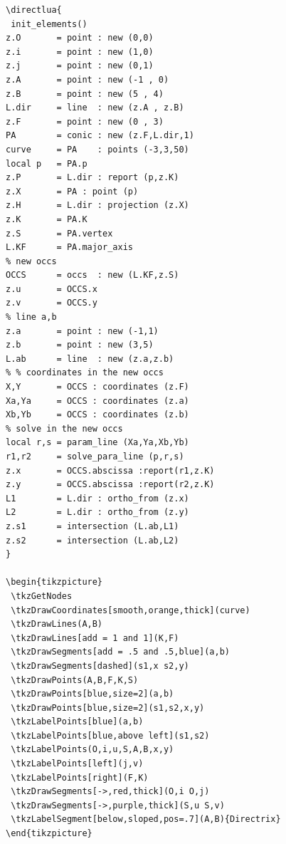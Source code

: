 \vspace{6pt}
\begin{Verbatim}
\directlua{
 init_elements()
z.O       = point : new (0,0)
z.i       = point : new (1,0)
z.j       = point : new (0,1)
z.A       = point : new (-1 , 0)
z.B       = point : new (5 , 4)
L.dir     = line  : new (z.A , z.B)
z.F       = point : new (0 , 3)        
PA        = conic : new (z.F,L.dir,1)
curve     = PA    : points (-3,3,50)
local p   = PA.p
z.P       = L.dir : report (p,z.K)
z.X       = PA : point (p)
z.H       = L.dir : projection (z.X)
z.K       = PA.K
z.S       = PA.vertex
L.KF      = PA.major_axis
% new occs          
OCCS      = occs  : new (L.KF,z.S)
z.u       = OCCS.x
z.v       = OCCS.y
% line a,b
z.a       = point : new (-1,1)
z.b       = point : new (3,5)
L.ab      = line  : new (z.a,z.b)
% % coordinates in the new occs
X,Y       = OCCS : coordinates (z.F)
Xa,Ya     = OCCS : coordinates (z.a)
Xb,Yb     = OCCS : coordinates (z.b)
% solve in the new occs
local r,s = param_line (Xa,Ya,Xb,Yb)
r1,r2     = solve_para_line (p,r,s)
z.x       = OCCS.abscissa :report(r1,z.K)
z.y       = OCCS.abscissa :report(r2,z.K)
L1        = L.dir : ortho_from (z.x)
L2        = L.dir : ortho_from (z.y)
z.s1      = intersection (L.ab,L1)
z.s2      = intersection (L.ab,L2)
}

\begin{tikzpicture}
 \tkzGetNodes
 \tkzDrawCoordinates[smooth,orange,thick](curve)
 \tkzDrawLines(A,B)
 \tkzDrawLines[add = 1 and 1](K,F)
 \tkzDrawSegments[add = .5 and .5,blue](a,b)
 \tkzDrawSegments[dashed](s1,x s2,y)
 \tkzDrawPoints(A,B,F,K,S)
 \tkzDrawPoints[blue,size=2](a,b)
 \tkzDrawPoints[blue,size=2](s1,s2,x,y)
 \tkzLabelPoints[blue](a,b)
 \tkzLabelPoints[blue,above left](s1,s2)
 \tkzLabelPoints(O,i,u,S,A,B,x,y)
 \tkzLabelPoints[left](j,v)
 \tkzLabelPoints[right](F,K)
 \tkzDrawSegments[->,red,thick](O,i O,j)
 \tkzDrawSegments[->,purple,thick](S,u S,v)
 \tkzLabelSegment[below,sloped,pos=.7](A,B){Directrix}
\end{tikzpicture}
\end{Verbatim}


